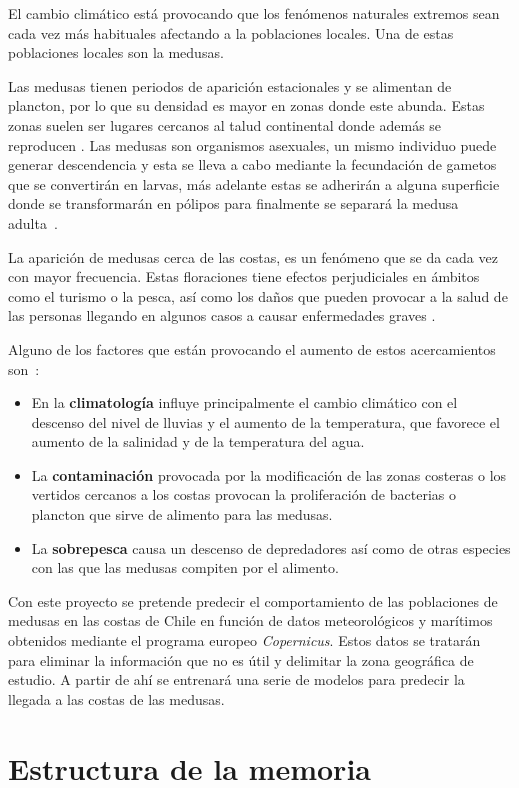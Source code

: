 
\begin{comment}
Descripción del contenido del trabajo y del estrucutra de la memoria y del resto de materiales entregados.
\end{comment}

El cambio climático está provocando que los fenómenos naturales extremos sean cada vez más habituales afectando a la poblaciones locales. Una de estas poblaciones locales son la medusas.

Las medusas tienen periodos de aparición estacionales y se alimentan de plancton, por lo que su densidad es mayor en zonas donde este abunda. Estas zonas suelen ser lugares cercanos al talud continental donde además se reproducen \cite{noauthor_proliferaciones_nodate}. Las medusas son organismos asexuales, un mismo individuo puede generar descendencia y esta se lleva a cabo mediante la fecundación de gametos que se convertirán en larvas, más adelante estas se adherirán a alguna superficie donde se transformarán en pólipos para finalmente se separará la medusa adulta~\cite{noauthor_reproduccion_2016}.

La aparición de medusas cerca de las costas, es un fenómeno que se da cada vez con mayor frecuencia. Estas floraciones tiene efectos perjudiciales en ámbitos como el turismo o la pesca, así como los daños que pueden provocar a la salud de las personas llegando en algunos casos a causar enfermedades graves \cite{art:picaduras_1,art:picaduras_2}. 

Alguno de los factores que están provocando el aumento de estos acercamientos son~\cite{noauthor_proliferaciones_nodate,art:ArticuloCanepa_1}:
\begin{itemize}
	\item En la \textbf{climatología} influye principalmente el cambio climático con el descenso del nivel de lluvias y el aumento de la temperatura, que favorece el aumento de la salinidad y de la temperatura del agua. 
	\item La \textbf{contaminación} provocada por la modificación de las zonas costeras o los vertidos cercanos a los costas provocan la proliferación de bacterias o plancton que sirve de alimento para las medusas.
	\item La \textbf{sobrepesca} causa un descenso de depredadores así como de otras especies con las que las medusas compiten por el alimento.
\end{itemize}

Con este proyecto se pretende predecir el comportamiento de las poblaciones de medusas en las costas de Chile en función de datos meteorológicos y marítimos obtenidos mediante el programa europeo \emph{Copernicus}. Estos datos se tratarán para eliminar la información que no es útil y delimitar la zona geográfica de estudio. A partir de ahí se entrenará una serie de modelos para predecir la llegada a las costas de las medusas.

\section{Estructura de la memoria}